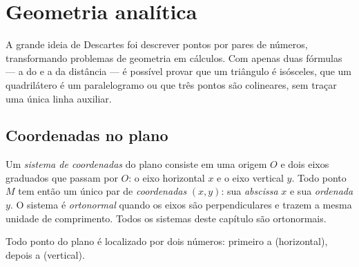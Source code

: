 \chapter{Geometria analítica}\label{ch:g10:coordgeom}

A grande ideia de Descartes foi descrever pontos por pares de números,
transformando problemas de geometria em cálculos. Com apenas duas
fórmulas --- a do  e a da distância --- é possível provar que
um triângulo é isósceles, que um quadrilátero é um paralelogramo ou que
três pontos são colineares, sem traçar uma única linha auxiliar.

\section{Coordenadas no plano}

\begin{definition}\label{def:g10:coordgeom:system}
Um \emph{sistema de coordenadas} do plano
consiste em uma origem $O$ e dois eixos graduados que passam por $O$: o
eixo horizontal $x$ e o eixo vertical $y$. Todo ponto $M$ tem então um
único par de \emph{coordenadas} $(x, y)$: sua
\emph{abscissa} $x$ e sua
\emph{ordenada} $y$. O sistema é
\emph{ortonormal} quando os eixos são
perpendiculares e trazem a mesma unidade de comprimento. Todos os
sistemas deste capítulo são ortonormais.
\end{definition}

\begin{omfigure}

{\small Todo ponto do plano é localizado por dois números: primeiro a
 (horizontal), depois a  (vertical).}
\end{omfigure}

